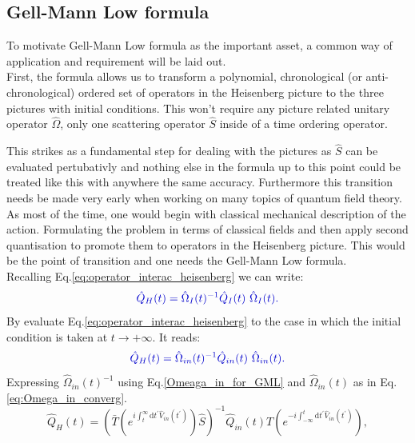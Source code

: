 \documentclass[12pt, titlepage]{article}
\begin{document}
\subsection{Gell-Mann Low formula}
%
To motivate Gell-Mann Low formula as the important asset, a common way of application and requirement will be laid out. \\
First, the formula allows us to transform a polynomial, chronological (or anti-chronological) ordered set of operators in the Heisenberg picture to  the three pictures with initial conditions. This won't require any picture related unitary operator $ \hat{\Omega} $, only one scattering operator $ \hat{S} $ inside of a time ordering operator. 

This strikes as a fundamental step for dealing with the pictures as $ \hat{S} $ can be evaluated pertubativly and nothing else in the formula up to this point could be treated like this with anywhere the same accuracy. Furthermore this transition needs be made very early when working on many topics of quantum field theory. As most of the time, one would begin with classical mechanical description of the action. Formulating the problem in terms of classical fields and then apply second quantisation to promote them to operators in the Heisenberg picture. This would be the point of transition and one needs the Gell-Mann Low formula.\\
%
Recalling Eq.\enskip\eqref{eq:operator_interac_heisenberg} we can write:
\begin{equation}\textcolor[RGB]{0,0,204}{
\hat{Q}_{H}(t)=\hat{\Omega}_{I}(t)^{-1}\hat{Q}_{I}(t)\ \hat{\Omega}_{I}(t).
}
\end{equation}
By evaluate Eq.\enskip\eqref{eq:operator_interac_heisenberg} to the case in which the initial condition is taken at $ t \rightarrow + \infty $. It reads:
\begin{equation}\textcolor[RGB]{0,0,204}{
\hat{Q}_{H}(t)=\hat{\Omega}_{in}(t)^{-1}\hat{Q}_{in}(t)\ \hat{\Omega}_{in}(t).
}
\end{equation}
Expressing $ \hat{\Omega}_{in}(t)^{-1} $ using Eq.\enskip\eqref{Omeaga_in_for_GML} and $ \hat{\Omega}_{in}(t) $ as in Eq.\enskip\eqref{eq:Omega_in_converg}.
\begin{equation}
\hat{Q}_{H}(t)
=\left( 
\bar{T}
\left( 
 e^{i\int_{t}^{\infty}\mathrm{d}t^{\prime} \hat{V}_{in}(t^{\prime})}
\right) 
\hat{S}
\right)^{-1}
\hat{Q}_{in}(t)
T
\left( 
 e^{-i\int_{-\infty}^{t}\mathrm{d}t^{\prime} \hat{V}_{in}(t^{\prime})}
\right) 
,
\end{equation}
\end{document}
